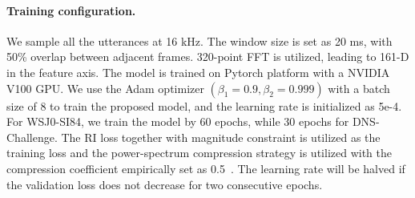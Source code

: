 \documentclass{article}
\begin{document}
{\paragraph{Training configuration.} We sample all the utterances at 16 kHz. The window size is set as 20 ms, with 50\% overlap between adjacent frames. 320-point FFT is utilized, leading to 161-D in the feature axis. The model is trained on Pytorch platform with a NVIDIA V100 GPU. We use the Adam optimizer $\left(\beta_{1} = 0.9, \beta_{2} = 0.999\right)$ with a batch size of 8 to train the proposed model, and the learning rate is initialized as 5e-4. For WSJ0-SI84, we train the model by 60 epochs, while 30 epochs for DNS-Challenge. The RI loss together with magnitude constraint is utilized as the training loss and the power-spectrum compression strategy is utilized with the compression coefficient empirically set as 0.5~{\cite{li2022glance}}. The learning rate will be halved if the validation loss does not decrease for two consecutive epochs.
\vspace{-0.15cm}
}
\end{document}
